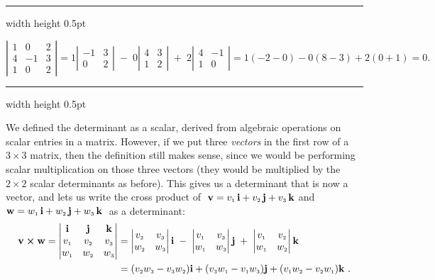 \vspace{3mm}
\hrule width \textwidth height 0.5pt
\begin{exmp}
 \begin{displaymath}
  \left|
  \begin{array}{rrr}
   1 & 0 & 2\\
   4 & -1 & 3\\
   1 & 0 & 2
  \end{array}\right|
  = 1 \left|\begin{array}{rr} -1 & 3 \\ 0 & 2 \end{array}\right| \;-\;
  0 \left|\begin{array}{rr} 4 & 3 \\ 1 & 2 \end{array}\right| \;+\;
  2 \left|\begin{array}{rr} 4 & -1 \\ 1 & 0 \end{array}\right|
  = 1(-2 - 0) - 0(8 - 3) + 2(0 + 1) = 0.
 \end{displaymath}
\end{exmp}
\hrule width \textwidth height 0.5pt
\vspace{2mm}

We defined the determinant as a scalar, derived from algebraic operations on scalar entries in a matrix. However,
if we put three \emph{vectors} in the first row of a $3 \times 3$ matrix, then the definition still
makes sense, since we would be performing scalar multiplication on those three vectors (they would be multiplied by
the $2 \times 2$ scalar determinants as before). This gives us a determinant that is now a vector, and lets us write the
cross product of $\;\textbf{v} = v_{\scriptscriptstyle 1}\,\textbf{i} + v_{\scriptscriptstyle 2}\,\textbf{j} + v_{\scriptscriptstyle 3}\,\textbf{k}$ and $\textbf{w} = w_{\scriptscriptstyle 1}\,\textbf{i} + w_{\scriptscriptstyle 2}\,\textbf{j} + w_{\scriptscriptstyle 3}\,\textbf{k}\;$ as a determinant:
\begin{align*}
 \textbf{v} \bm{\times} \textbf{w} =
 \begin{vmatrix}
  \textbf{i} & \textbf{j} & \textbf{k} \\ v_{\scriptscriptstyle 1} & v_{\scriptscriptstyle 2} & v_{\scriptscriptstyle 3} \\
  w_{\scriptscriptstyle 1} & w_{\scriptscriptstyle 2} & w_{\scriptscriptstyle 3}
 \end{vmatrix} &= \begin{vmatrix} v_{\scriptscriptstyle 2} & v_{\scriptscriptstyle 3} \\ w_{\scriptscriptstyle 2} & w_{\scriptscriptstyle 3} \end{vmatrix} \textbf{i} \;-\;
 \begin{vmatrix} v_{\scriptscriptstyle 1} & v_{\scriptscriptstyle 3} \\ w_{\scriptscriptstyle 1} & w_{\scriptscriptstyle 3} \end{vmatrix} \textbf{j} \;+\;
 \begin{vmatrix} v_{\scriptscriptstyle 1} & v_{\scriptscriptstyle 2} \\ w_{\scriptscriptstyle 1} & w_{\scriptscriptstyle 2} \end{vmatrix} \textbf{k}\\
 &= (v_{\scriptscriptstyle 2}w_{\scriptscriptstyle 3} -
v_{\scriptscriptstyle 3}w_{\scriptscriptstyle 2})\textbf{i} + (v_{\scriptscriptstyle 3}w_{\scriptscriptstyle 1} - v_{\scriptscriptstyle 1}w_{\scriptscriptstyle 3})\textbf{j} +
(v_{\scriptscriptstyle 1}w_{\scriptscriptstyle 2} - v_{\scriptscriptstyle 2}w_{\scriptscriptstyle 1})\textbf{k} ~.
\end{align*}

